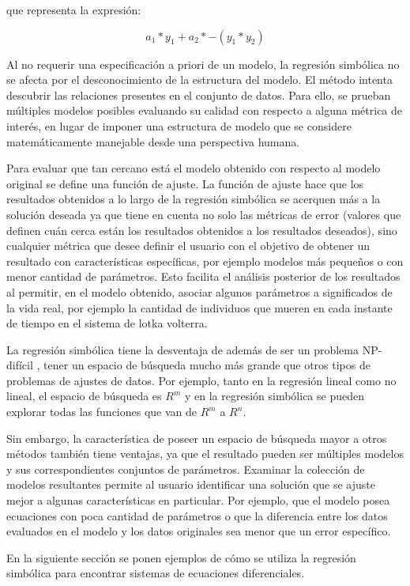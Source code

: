 que representa la expresión:

$$a_1 * y_1 + a_2 * -(y_1 * y_2)$$

Al no requerir una especificación a priori de un modelo, la regresión simbólica no se afecta por el desconocimiento de la estructura del modelo. El método intenta descubrir las relaciones presentes en el conjunto de datos. Para ello, se prueban múltiples modelos posibles evaluando su calidad con respecto a alguna métrica de interés, en lugar de imponer una estructura de modelo que se considere matemáticamente manejable desde una perspectiva humana.

Para evaluar que tan cercano está el modelo obtenido con respecto al modelo original se define una función de ajuste. La función de ajuste hace que los resultados obtenidos a lo largo de la regresión simbólica se acerquen más a la solución deseada ya que tiene en cuenta no solo las métricas de error (valores que definen cuán cerca están los resultados obtenidos a los resultados deseados), sino cualquier métrica que desee definir el usuario con el objetivo de obtener un resultado con características específicas, por ejemplo modelos más pequeños o con menor cantidad de parámetros. Esto facilita el análisis posterior de los resultados al permitir, en el modelo obtenido, asociar algunos parámetros a significados de la vida real, por ejemplo la cantidad de individuos que mueren en cada instante de tiempo en el sistema de lotka volterra.

La regresión simbólica tiene la desventaja de además de ser un problema NP-difícil \cite{virgolin2022symbolic}, tener un espacio de búsqueda mucho más grande que otros tipos de problemas de ajustes de datos. Por ejemplo, tanto en la regresión lineal como no lineal, el espacio de búsqueda es $R^m$ y en la regresión simbólica se pueden explorar todas las funciones que van de $R^m$ a $R^n$.

Sin embargo, la característica de poseer un espacio de búsqueda mayor a otros métodos también tiene ventajas, ya que el resultado pueden ser múltiples modelos y sus correspondientes conjuntos de parámetros. Examinar la colección de modelos resultantes permite al usuario identificar una solución que se ajuste mejor a algunas características en particular. Por ejemplo, que el modelo posea ecuaciones con poca cantidad de parámetros o que la diferencia entre los datos evaluados en el modelo y los datos originales sea menor que un error específico.

En la siguiente sección se ponen ejemplos de cómo se utiliza la regresión simbólica para encontrar sistemas de ecuaciones diferenciales.

